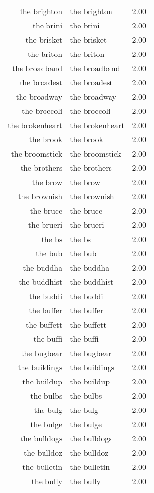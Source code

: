 \begin{table}[ht]
\begin{tabular}{rlr}
  the brighton & the brighton & 2.00 \\ 
  the brini & the brini & 2.00 \\ 
  the brisket & the brisket & 2.00 \\ 
  the briton & the briton & 2.00 \\ 
  the broadband & the broadband & 2.00 \\ 
  the broadest & the broadest & 2.00 \\ 
  the broadway & the broadway & 2.00 \\ 
  the broccoli & the broccoli & 2.00 \\ 
  the brokenheart & the brokenheart & 2.00 \\ 
  the brook & the brook & 2.00 \\ 
  the broomstick & the broomstick & 2.00 \\ 
  the brothers & the brothers & 2.00 \\ 
  the brow & the brow & 2.00 \\ 
  the brownish & the brownish & 2.00 \\ 
  the bruce & the bruce & 2.00 \\ 
  the brueri & the brueri & 2.00 \\ 
  the bs & the bs & 2.00 \\ 
  the bub & the bub & 2.00 \\ 
  the buddha & the buddha & 2.00 \\ 
  the buddhist & the buddhist & 2.00 \\ 
  the buddi & the buddi & 2.00 \\ 
  the buffer & the buffer & 2.00 \\ 
  the buffett & the buffett & 2.00 \\ 
  the buffi & the buffi & 2.00 \\ 
  the bugbear & the bugbear & 2.00 \\ 
  the buildings & the buildings & 2.00 \\ 
  the buildup & the buildup & 2.00 \\ 
  the bulbs & the bulbs & 2.00 \\ 
  the bulg & the bulg & 2.00 \\ 
  the bulge & the bulge & 2.00 \\ 
  the bulldogs & the bulldogs & 2.00 \\ 
  the bulldoz & the bulldoz & 2.00 \\ 
  the bulletin & the bulletin & 2.00 \\ 
  the bully & the bully & 2.00 \\ 

\end{tabular}
\end{table}
